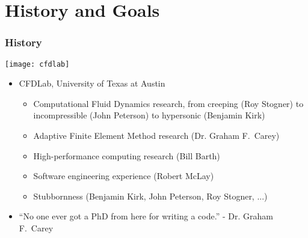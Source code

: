 

%




\section{\libMesh{} History and Goals}
\frame
{
  \frametitle{History}

  \begin{center}
  \texttt{[image: cfdlab]}
  \end{center}

  \begin{itemize}
    \item CFDLab, University of Texas at Austin
      \begin{itemize}
        \item Computational Fluid Dynamics research, from creeping
          (Roy Stogner) to incompressible (John Peterson) to hypersonic
          (Benjamin Kirk)
        \item Adaptive Finite Element Method research (Dr. Graham F.\ Carey)
        \item High-performance computing research (Bill Barth)
        \item Software engineering experience (Robert McLay)
        \item<3-> Stubbornness (Benjamin Kirk, John Peterson, Roy Stogner, ...)
      \end{itemize}
    \item<2-> ``No one ever got a PhD from here for writing a code.'' - Dr. Graham F.\ Carey
  \end{itemize}  


}



